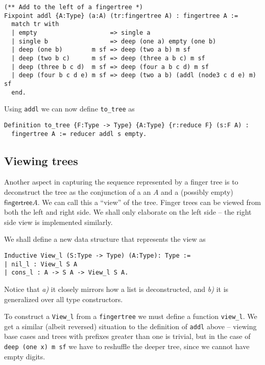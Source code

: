 \documentclass{article}
\newcommand{\code}[1]{\texttt{#1}}
\begin{document}
\begin{listing}[H]
\begin{verbatim}
(** Add to the left of a fingertree *)
Fixpoint addl {A:Type} (a:A) (tr:fingertree A) : fingertree A :=
  match tr with
  | empty                    => single a
  | single b                 => deep (one a) empty (one b)
  | deep (one b)        m sf => deep (two a b) m sf
  | deep (two b c)      m sf => deep (three a b c) m sf
  | deep (three b c d)  m sf => deep (four a b c d) m sf
  | deep (four b c d e) m sf => deep (two a b) (addl (node3 c d e) m) sf
  end.
\end{verbatim}
\end{listing}

Using \code{addl} we can now define \code{to\_tree} as

\begin{verbatim}
Definition to_tree {F:Type -> Type} {A:Type} {r:reduce F} (s:F A) :
  fingertree A := reducer addl s empty.
\end{verbatim}

\subsection{Viewing trees}
Another aspect in capturing the sequence represented by a finger tree is to deconstruct
the tree as the conjunction of a an $A$ and a (possibly empty) $\textsf{fingertree} A$.
We can call this a ``view'' of the tree. Finger trees can be viewed from both
the left and right side. We shall only elaborate on the left side -- the right
side view is implemented similarly.

We shall define a new data structure that represents the view as
\begin{verbatim}
Inductive View_l (S:Type -> Type) (A:Type): Type :=
| nil_l : View_l S A
| cons_l : A -> S A -> View_l S A.
\end{verbatim}

Notice that \textit{a)} it closely mirrors how a list is deconstructed, and
\textit{b)} it is generalized over all type constructors.

To construct a \code{View\_l} from a \code{fingertree} we must define a function
\code{view\_l}.
We get a similar (albeit reversed) situation to the definition of \code{addl}
above -- viewing base cases and trees with prefixes greater than one is
trivial, but in the case of \code{deep (one x) m sf} we have to reshuffle
the deeper tree, since we cannot have empty digits.
\end{document}
